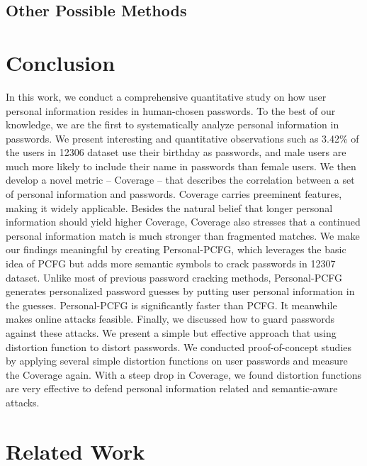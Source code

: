 \documentclass{sig-alternate}
\begin{document}
\subsection{Other Possible Methods}

\section{Conclusion}
In this work, we conduct a comprehensive quantitative study on how user personal information resides in human-chosen passwords. To the best of our knowledge, we are the first to systematically analyze personal information in passwords. We present interesting and quantitative observations such as 3.42\% of the users in 12306 dataset use their birthday as passwords, and male users are much more likely to include their name in passwords than female users. We then develop a novel metric -- Coverage -- that describes the correlation between a set of personal information and passwords. Coverage carries preeminent features, making it widely applicable. Besides the natural belief that longer personal information should yield higher Coverage, Coverage also stresses that a continued personal information match is much stronger than fragmented matches. We make our findings meaningful by creating Personal-PCFG, which leverages the basic idea of PCFG but adds more semantic symbols to crack passwords in 12307 dataset. Unlike most of previous password cracking methods, Personal-PCFG generates personalized password guesses by putting user personal information in the guesses. Personal-PCFG is significantly faster than PCFG. It meanwhile makes online attacks feasible. Finally, we discussed how to guard passwords against these attacks. We present a simple but effective approach that using distortion function to distort passwords. We conducted proof-of-concept studies by applying several simple distortion functions on user passwords and measure the Coverage again. With a steep drop in Coverage, we found distortion functions are very effective to defend personal information related and semantic-aware attacks.

\section{Related Work}
\end{document}
